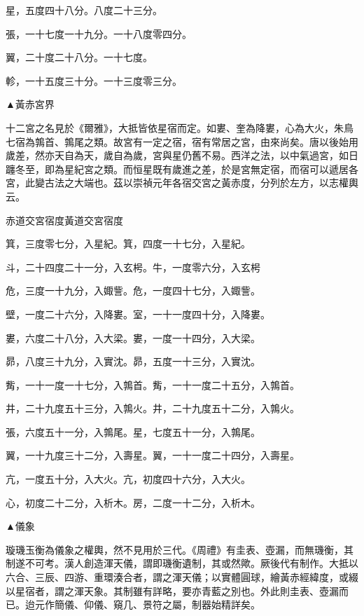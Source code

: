\begin{pinyinscope}
星，五度四十八分。八度二十三分。

張，一十七度一十九分。一十八度零四分。

翼，二十度二十八分。一十七度。

軫，一十五度三十分。一十三度零三分。

▲黃赤宮界

十二宮之名見於《爾雅》，大抵皆依星宿而定。如婁、奎為降婁，心為大火，朱鳥七宿為鶉首、鶉尾之類。故宮有一定之宿，宿有常居之宮，由來尚矣。唐以後始用歲差，然亦天自為天，歲自為歲，宮與星仍舊不易。西洋之法，以中氣過宮，如日躔冬至，即為星紀宮之類。而恒星既有歲進之差，於是宮無定宿，而宿可以遞居各宮，此變古法之大端也。茲以崇禎元年各宿交宮之黃赤度，分列於左方，以志權輿云。

赤道交宮宿度黃道交宮宿度

箕，三度零七分，入星紀。箕，四度一十七分，入星紀。

斗，二十四度二十一分，入玄枵。牛，一度零六分，入玄枵

危，三度一十九分，入娵訾。危，一度四十七分，入娵訾。

壁，一度二十六分，入降婁。室，一十一度四十分，入降婁。

婁，六度二十八分，入大梁。婁，一度一十四分，入大梁。

昴，八度三十九分，入實沈。昴，五度一十三分，入實沈。

觜，一十一度一十七分，入鶉首。觜，一十一度二十五分，入鶉首。

井，二十九度五十三分，入鶉火。井，二十九度五十二分，入鶉火。

張，六度五十一分，入鶉尾。星，七度五十一分，入鶉尾。

翼，一十九度三十二分，入壽星。翼，一十一度二十四分，入壽星。

亢，一度五十分，入大火。亢，初度四十六分，入大火。

心，初度二十二分，入析木。房，二度一十二分，入析木。

▲儀象

璇璣玉衡為儀象之權輿，然不見用於三代。《周禮》有圭表、壺漏，而無璣衡，其制遂不可考。漢人創造渾天儀，謂即璣衡遺制，其或然歟。厥後代有制作。大抵以六合、三辰、四游、重環湊合者，謂之渾天儀；以實體圓球，繪黃赤經緯度，或綴以星宿者，謂之渾天象。其制雖有詳略，要亦青藍之別也。外此則圭表、壺漏而已。迨元作簡儀、仰儀、窺几、景符之屬，制器始精詳矣。


\end{pinyinscope}
